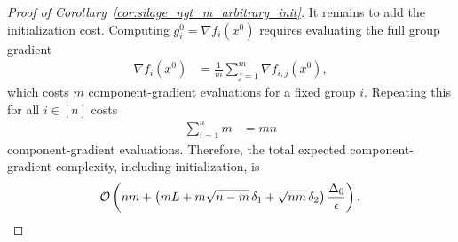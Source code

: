 \documentclass{article}
\newcommand{\cO}{{\cal O}}
\newcommand{\rb}[1]{\left(#1\right)}
\newcommand {\rbl}[1]{(#1)} %
\newcommand{\nfi}[1]{\nabla f_i\rbl{#1}}
\theoremstyle{plain}
\begin{document}
\begin{proof}[Proof of Corollary~\ref{cor:silage_ngt_m_arbitrary_init}]
It remains to add the initialization cost. Computing $g_i^0=\nfi{x^0}$ requires evaluating the full group gradient
\begin{align*}
\nfi{x^0}
&=
\frac1m\sum_{j=1}^m \nabla f_{i,j}(x^0),
\end{align*}
which costs $m$ component-gradient evaluations for a fixed group $i$. Repeating this for all $i\in[n]$ costs
\begin{align*}
\sum_{i=1}^n m
&=
mn
\end{align*}
component-gradient evaluations. Therefore, the total expected component-gradient complexity, including initialization, is
\begin{align*}
\cO\rb{
nm +
\rb{
mL+m\sqrt{n-m}\,\delta_1+\sqrt{nm}\,\delta_2
}
\frac{\Delta_0}{\epsilon}
}.
\end{align*}



\end{proof}
\end{document}

